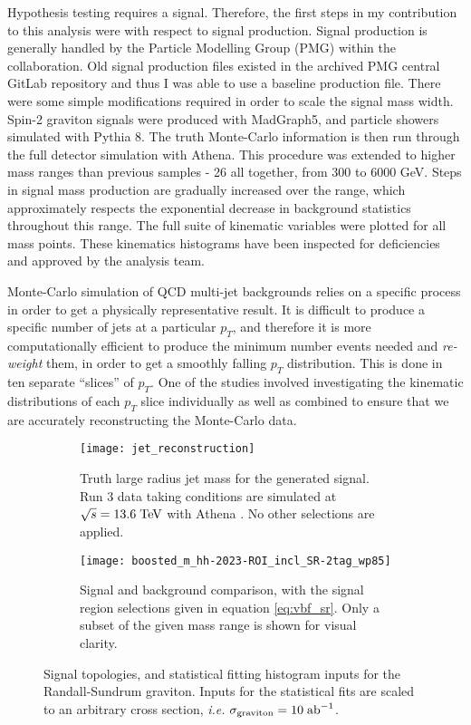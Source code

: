 \documentclass[12pt]{article}
\begin{document}
Hypothesis testing requires a signal. Therefore, the first steps in my
contribution to this analysis were with respect to signal production. Signal
production is generally handled by the Particle Modelling Group (PMG) within the
collaboration. Old signal production files existed in the archived PMG central
GitLab repository and thus I was able to use a baseline production file. There
were some simple modifications required in order to scale the signal mass width.
Spin-2 graviton signals were produced with MadGraph5, and particle showers
simulated with Pythia 8. The truth Monte-Carlo information is then run through
the full detector simulation with Athena. This procedure was extended to higher
mass ranges than previous samples - 26 all together, from 300 to 6000 GeV. Steps
in signal mass production are gradually increased over the range, which
approximately respects the exponential decrease in background statistics
throughout this range. The full suite of kinematic variables were plotted for
all mass points. These kinematics histograms have been inspected for
deficiencies and approved by the analysis team.


Monte-Carlo simulation of QCD multi-jet backgrounds relies on a specific process
in order to get a physically representative result. It is difficult to produce a
specific number of jets at a particular $p_T$, and therefore it is more
computationally efficient to produce the minimum number events needed and
\textit{re-weight} them, in order to get a smoothly falling $p_T$ distribution.
This is done in ten separate ``slices'' of $p_T$. One of the studies involved
investigating the kinematic distributions of each $p_T$ slice individually as
well as combined to ensure that we are accurately reconstructing the Monte-Carlo
data.

\begin{figure}[t]
    \centering
    \begin{subfigure}[t]{.48\textwidth}
        \centering
        \texttt{[image: jet\_reconstruction]}
        \caption{Truth large radius jet mass for the generated signal. Run 3
        data taking conditions are simulated at $\sqrt{s}=13.6\;\text{TeV}$ with
        Athena \cite{atlas_simulation}. No other selections are applied.}
        \label{subfig:jet_reconstruction}
    \end{subfigure}
    \hfill
    \begin{subfigure}[t]{.48\textwidth}
        \centering
        \texttt{[image: boosted\_m\_hh-2023-ROI\_incl\_SR-2tag\_wp85]}
        \caption{Signal and background comparison, with the signal region
        selections given in equation \ref{eq:vbf_sr}. Only a subset of the given
        mass range is shown for visual clarity.}
        \label{subfig:input_hists}
    \end{subfigure}
    \caption{Signal topologies, and statistical fitting histogram inputs for the
    Randall-Sundrum graviton. Inputs for the statistical fits are scaled to an
    arbitrary cross section, \textit{i.e.}
    $\sigma_{\text{graviton}}=10\;\text{ab}^{-1}$.}
\label{fig:my_contributions}
\end{figure}
\end{document}
